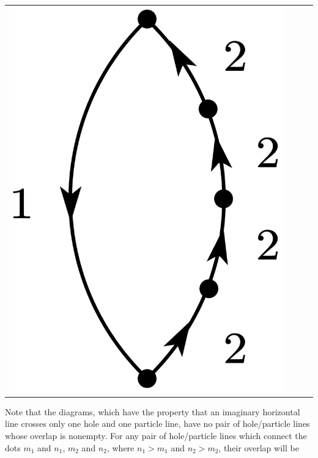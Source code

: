 \documentclass[a4paper]{book}
\newcounter{solution}[chapter]
\begin{document}
\begin{solution}
\begin{center}
\begin{tabular}{cccc}
		\begin{minipage}{0.22\linewidth}
		\centering
		\includegraphics[scale=1.0,trim=0 -4 0 -4]{./pictures/6.01/8.png}
		\captionof*{figure}{$\displaystyle (-1)^{1+1} \frac{ V_{12} V_{21} V^3_{22} }{ ( E^{(0)}_1 - E^{(0)}_2)^4 }$}
		\end{minipage} 
		
	\end{tabular}
	\label{fig:exe1}
	\end{center}
	
	Note that the diagrams, which have the property that an imaginary horizontal line crosses only one hole and one particle line, have no pair of hole/particle lines whose overlap is nonempty. For any pair of hole/particle lines which connect the dots $m_1$ and $n_1$, $m_2$ and $n_2$, where $n_1 > m_1$ and $n_2 > m_2$, their overlap will be 
	\begin{itemize}
	

\end{itemize}
\end{solution}
\end{document}
